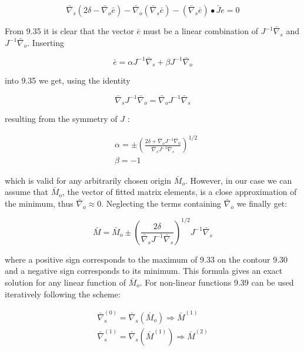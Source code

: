 \documentclass[10pt]{article}
\begin{document}
\begin{equation*}
\bar{\nabla}_{s}\left(2 \delta-\bar{\nabla}_{o} \bar{e}\right)-\bar{\nabla}_{o}\left(\bar{\nabla}_{s} \bar{e}\right)-\left(\bar{\nabla}_{s} \bar{e}\right) \bullet \bar{J} e=0 \tag{9.35}
\end{equation*}


From 9.35 it is clear that the vector $\bar{e}$ must be a linear combination of $J^{-1} \bar{\nabla}_{s}$ and $J^{-1} \bar{\nabla}_{o}$. Inserting


\begin{equation*}
\bar{e}=\alpha J^{-1} \bar{\nabla}_{s}+\beta J^{-1} \bar{\nabla}_{o} \tag{9.36}
\end{equation*}


into 9.35 we get, using the identity


\begin{equation*}
\bar{\nabla}_{s} J^{-1} \bar{\nabla}_{o}=\bar{\nabla}_{o} J^{-1} \bar{\nabla}_{s} \tag{9.37}
\end{equation*}


resulting from the symmetry of $J$ :


\begin{align*}
& \alpha= \pm\left(\frac{2 \delta+\bar{\nabla}_{o} J^{-1} \bar{\nabla}_{0}}{\bar{\nabla}_{s} J^{-1} \bar{\nabla}_{s}}\right)^{1 / 2}  \tag{9.38}\\
& \beta=-1
\end{align*}


which is valid for any arbitrarily chosen origin $\bar{M}_{o}$. However, in our case we can assume that $\bar{M}_{o}$, the vector of fitted matrix elements, is a close approximation of the minimum, thus $\bar{\nabla}_{o} \approx 0$. Neglecting the terms containing $\bar{\nabla}_{o}$ we finally get:


\begin{equation*}
\bar{M}=\bar{M}_{o} \pm\left(\frac{2 \delta}{\bar{\nabla}_{s} J^{-1} \bar{\nabla}_{s}}\right)^{1 / 2} J^{-1} \bar{\nabla}_{s} \tag{9.39}
\end{equation*}


where a positive sign corresponds to the maximum of 9.33 on the contour 9.30 and a negative sign corresponds to its minimum. This formula gives an exact solution for any linear function of $\bar{M}_{o}$. For non-linear functions 9.39 can be used iteratively following the scheme:


\begin{gather*}
\bar{\nabla}_{s}^{(0)}=\bar{\nabla}_{s}\left(\bar{M}_{o}\right) \Longrightarrow \bar{M}^{(1)} \\
\bar{\nabla}_{s}^{(1)}=\bar{\nabla}_{s}\left(\bar{M}^{(1)}\right) \Longrightarrow \bar{M}^{(2)} \tag{9.40}
\end{gather*}
\end{document}
